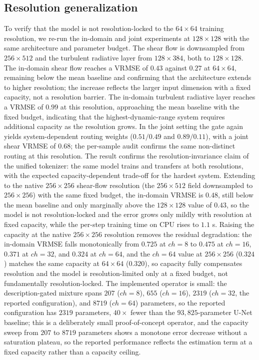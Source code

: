 \documentclass[preprint,12pt]{elsarticle}
\begin{document}
\subsection{Resolution generalization}
To verify that the model is not resolution-locked to the $64\times64$ training resolution, we re-run the in-domain and joint experiments at $128\times128$ with the same architecture and parameter budget. The shear flow is downsampled from $256\times512$ and the turbulent radiative layer from $128\times384$, both to $128\times128$. The in-domain shear flow reaches a VRMSE of $0.43$ against $0.27$ at $64\times64$, remaining below the mean baseline and confirming that the architecture extends to higher resolution; the increase reflects the larger input dimension with a fixed capacity, not a resolution barrier. The in-domain turbulent radiative layer reaches a VRMSE of $0.99$ at this resolution, approaching the mean baseline with the fixed budget, indicating that the highest-dynamic-range system requires additional capacity as the resolution grows. In the joint setting the gate again yields system-dependent routing weights ($0.51/0.49$ and $0.89/0.11$), with a joint shear VRMSE of $0.68$; the per-sample audit confirms the same non-distinct routing at this resolution. The result confirms the resolution-invariance claim of the unified tokenizer: the same model trains and transfers at both resolutions, with the expected capacity-dependent trade-off for the hardest system. Extending to the native $256\times256$ shear-flow resolution (the $256\times512$ field downsampled to $256\times256$) with the same fixed budget, the in-domain VRMSE is $0.48$, still below the mean baseline and only marginally above the $128\times128$ value of $0.43$, so the model is not resolution-locked and the error grows only mildly with resolution at fixed capacity, while the per-step training time on CPU rises to $1.1$ s. Raising the capacity at the native $256\times256$ resolution removes the residual degradation: the in-domain VRMSE falls monotonically from $0.725$ at $ch=8$ to $0.475$ at $ch=16$, $0.371$ at $ch=32$, and $0.324$ at $ch=64$, and the $ch=64$ value at $256\times256$ ($0.324$) matches the same capacity at $64\times64$ ($0.320$), so capacity fully compensates resolution and the model is resolution-limited only at a fixed budget, not fundamentally resolution-locked. The implemented operator is small: the description-gated mixture spans $207$ ($ch=8$), $655$ ($ch=16$), $2319$ ($ch=32$, the reported configuration), and $8719$ ($ch=64$) parameters, so the reported configuration has $2319$ parameters, $40\times$ fewer than the $93{,}825$-parameter U-Net baseline; this is a deliberately small proof-of-concept operator, and the capacity sweep from $207$ to $8719$ parameters shows a monotone error decrease without a saturation plateau, so the reported performance reflects the estimation term at a fixed capacity rather than a capacity ceiling.
\end{document}
